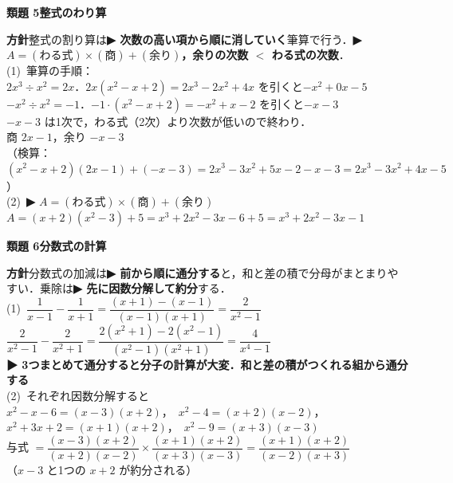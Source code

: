 \documentclass[a4paper,11pt]{ltjsarticle}
\newcommand{\ans}[2]{\Needspace{5\baselineskip}\vspace{6pt}%
  {\sffamily\bfseries 類題 #1\quad #2}\par}
\newcommand{\point}[1]{\textsf{\bfseries ▶ #1}}
\begin{document}
\ans{5}{整式のわり算}
\begin{kai}
\textbf{方針}\quad 整式の割り算は\point{次数の高い項から順に消していく}筆算で行う．\point{$A=(\text{わる式})\times(\text{商})+(\text{余り})$，余りの次数 $<$ わる式の次数}．\\[2pt]
(1)\ 筆算の手順：\\
\hspace*{1.5em}$2x^3\div x^2=2x$．\quad $2x(x^2-x+2)=2x^3-2x^2+4x$ を引くと\quad $-x^2+0x-5$\\
\hspace*{1.5em}$-x^2\div x^2=-1$．\quad $-1\cdot(x^2-x+2)=-x^2+x-2$ を引くと\quad $-x-3$\\
\hspace*{1.5em}$-x-3$ は1次で，わる式（2次）より次数が低いので終わり．\\
\hspace*{1.5em}商 $2x-1$，\quad 余り $-x-3$\\
\hspace*{1.5em}（検算：$(x^2-x+2)(2x-1)+(-x-3)=2x^3-3x^2+5x-2-x-3=2x^3-3x^2+4x-5$）\\[2pt]
(2)\ \point{$A=(\text{わる式})\times(\text{商})+(\text{余り})$}\\
\hspace*{1.5em}$A=(x+2)(x^2-3)+5=x^3+2x^2-3x-6+5=x^3+2x^2-3x-1$
\end{kai}

\ans{6}{分数式の計算}
\begin{kai}
\textbf{方針}\quad 分数式の加減は\point{前から順に通分する}と，和と差の積で分母がまとまりやすい．乗除は\point{先に因数分解して約分}する．\\[2pt]
(1)\ $\dfrac1{x-1}-\dfrac1{x+1}=\dfrac{(x+1)-(x-1)}{(x-1)(x+1)}=\dfrac{2}{x^2-1}$\\[2pt]
\hspace*{1.5em}$\dfrac2{x^2-1}-\dfrac2{x^2+1}=\dfrac{2(x^2+1)-2(x^2-1)}{(x^2-1)(x^2+1)}=\dfrac{4}{x^4-1}$\\[2pt]
\hspace*{1.5em}\point{3つまとめて通分すると分子の計算が大変．和と差の積がつくれる組から通分する}\\[2pt]
(2)\ それぞれ因数分解すると\\
\hspace*{1.5em}$x^2-x-6=(x-3)(x+2)$，\ $x^2-4=(x+2)(x-2)$，\ $x^2+3x+2=(x+1)(x+2)$，\ $x^2-9=(x+3)(x-3)$\\[2pt]
\hspace*{1.5em}与式 $=\dfrac{(x-3)(x+2)}{(x+2)(x-2)}\times\dfrac{(x+1)(x+2)}{(x+3)(x-3)}=\dfrac{(x+1)(x+2)}{(x-2)(x+3)}$\\
\hspace*{1.5em}（$x-3$ と1つの $x+2$ が約分される）
\end{kai}
\end{document}
